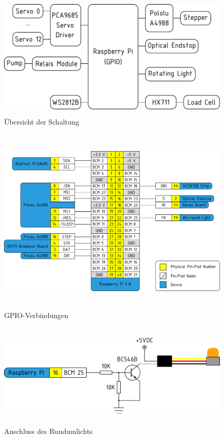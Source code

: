 \documentclass[a4paper]{scrartcl}
\begin{document}
\begin{figure}
  \centering
  \includegraphics[height=6cm]{pics/RPi_GPIO_overview.pdf}
  \caption{Übersicht der Schaltung} \label{GPIO_overview}
\end{figure}

\begin{figure}
  \centering
  \includegraphics[height=9cm]{pics/Hector9000_connections.pdf}
  \caption{GPIO-Verbindungen} \label{GPIO_connections}
\end{figure}

\begin{figure}
  \centering
  \includegraphics[height=5cm]{pics/rundumlicht.pdf}
  \caption{Anschluss des Rundumlichts} \label{rundumlicht}
\end{figure}
\end{document}
